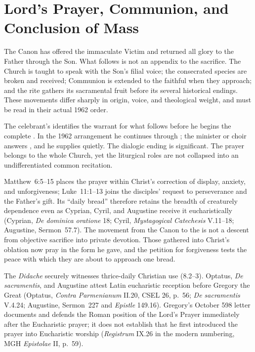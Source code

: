 \section{Lord's Prayer, Communion, and Conclusion of Mass}

The Canon has offered the immaculate Victim and returned all glory to the Father through the Son. What follows is not an appendix to the sacrifice. The Church is taught to speak with the Son's filial voice; the consecrated species are broken and received; Communion is extended to the faithful when they approach; and the rite gathers its sacramental fruit before its several historical endings. These movements differ sharply in origin, voice, and theological weight, and must be read in their actual 1962 order.


The celebrant's  identifies the warrant for what follows before he begins the complete . In the 1962 arrangement he continues through ; the minister or choir answers , and he supplies  quietly. The dialogic ending is significant. The prayer belongs to the whole Church, yet the liturgical roles are not collapsed into an undifferentiated common recitation.

Matthew~6:5--15 places the prayer within Christ's correction of display, anxiety, and unforgiveness; Luke~11:1--13 joins the disciples' request to perseverance and the Father's gift. Its ``daily bread'' therefore retains the breadth of creaturely dependence even as Cyprian, Cyril, and Augustine receive it eucharistically (Cyprian, \emph{De dominica oratione} 18; Cyril, \emph{Mystagogical Catechesis} V.11--18; Augustine, Sermon~57.7). The movement from the Canon to the  is not a descent from objective sacrifice into private devotion. Those gathered into Christ's oblation now pray in the form he gave, and the petition for forgiveness tests the peace with which they are about to approach one bread.

The \emph{Didache} securely witnesses thrice-daily Christian use (8.2--3). Optatus, \emph{De sacramentis}, and Augustine attest Latin eucharistic reception before Gregory the Great (Optatus, \emph{Contra Parmenianum} II.20, CSEL 26, p.~56; \emph{De sacramentis} V.4.24; Augustine, Sermon~227 and \emph{Epistle} 149.16). Gregory's October 598 letter documents and defends the Roman position of the Lord's Prayer immediately after the Eucharistic prayer; it does not establish that he first introduced the prayer into Eucharistic worship (\emph{Registrum} IX.26 in the modern numbering, MGH \emph{Epistolae} II, p.~59).

